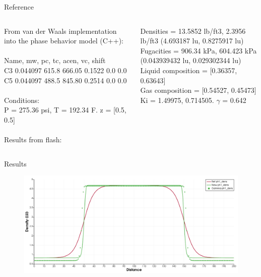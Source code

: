 \documentclass[8pt]{beamer}
\begin{document}
	\begin{frame}{Reference}
		
		\begin{columns}
			
			From van der Waals implementation into the phase behavior model (C++):\\~\\
			
			Name, mw, pc, tc, acen, vc, shift\\
			C3 0.044097 615.8 666.05 0.1522 0.0 0.0\\
			C5 0.044097 488.5 845.80 0.2514 0.0 0.0\\~\\
			
			Conditions:\\
			P = 275.36 psi, T = 192.34 F. z = [0.5, 0.5]\\~\\
			
			Results from flash:
			
			Densities = 13.5852 lb/ft3, 2.3956 lb/ft3 (4.693187 lu, 0.8275917 lu)\\
			Fugacities = 906.34 kPa, 604.423 kPa (0.043939432 lu, 0.029302344 lu)\\
			Liquid composition = [0.36357, 0.63643]\\
			Gas composition = [0.54527, 0.45473]\\
			Ki = 1.49975, 0.714505. $\gamma$ = 0.642
			
		\end{columns}
		
	\end{frame}


	\begin{frame}{Results}
		\begin{figure}
			\centering
			\includegraphics[width=\textwidth]{pics/1dnewForce/density.png}
		\end{figure}
	\end{frame}
	
\end{document}
